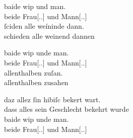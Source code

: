 \begin{exe}
\ex \label{ex:konjmixbeide2}
	\begin{xlist}
	\ex \label{ex:konjmixbeide2_1}
		\gll baide wip und man. \\
			beide Frau[\Nom.\Pl.\NeutF] und Mann[\Nom.\Pl.\MascM] \\ %
	\sn \gll ſciden alle weíninde dann. \\
			schieden alle weinend dannen \\
		\begin{taggedline}{\parencites[\pno~7ra,38--39]{kc:A1}[vgl.][1564--1565]{schroeder1895}}
		\trans {}
		\end{taggedline}

	\ex \label{ex:konjmixbeide2_2}
		\gll baide wip unde man. \\
			beide Frau[\Nom.\NeutF.\Pl] und Mann[\Nom.\Pl.\MascM] \\ %
	\sn \gll allenthalben zuſan. \\
			allenthalben zusahen \\
		\begin{taggedline}{\parencites[\pno~58va,44--45]{kc:A1}[vgl.][13573--13574]{schroeder1895}}
		\trans {}
		\end{taggedline}

	\ex \label{ex:konjmixbeide2_3}
		\gll daz allez ſin hibiſc bekert wart. \\
			dass alles sein Geschlecht bekehrt wurde \\
	\sn \gll baide wip unde man. \\
			beide Frau[\Nom.\Pl.\NeutF] und Mann[\Nom.\Pl.\MascM] \\
		\begin{taggedline}{\parencites[\pno~27va,9--11]{kc:A1}[6360--6361]{schroeder1895}}
		\trans {}
		\end{taggedline}


\end{xlist}
\end{exe}
